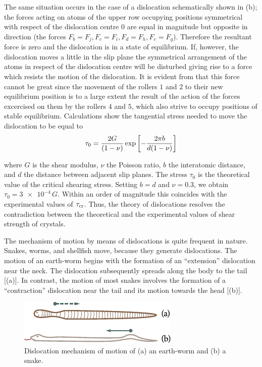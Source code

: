 The same situation occurs in the case of a dislocation schematically shown in (b); the forces acting on atoms of the upper row occupying positions symmetrical with respect of the dislocation centre $0$ are equal in magnitude but opposite in direction (the forces $F_b=F_j, F_c=F_i, F_d=F_h, F_e=F_g$). Therefore the resultant force is zero and the dislocation is in a state of equilibrium. If, however, the dislocation moves a little in the slip plane the symmetrical arrangement of the atoms in respect of the dislocation centre will be disturbed giving rise to a force which resists the motion of the dislocation. It is evident from  that this force cannot be great since the movement of the rollers $1$ and $2$ to their new equilibrium position is to a large extent the result of the action of the forces excercised on them by the rollers $4$ and $5$, which also strive to occupy positions of stable equilibrium. Calculations show the tangential stress needed to move the dislocation to be equal to
\begin{equation}\label{eq:2_17}
	\tau_0 = \frac{2G}{(1-\nu)} \exp\left[-\frac{2\pi b}{d(1-\nu)}\right]
\end{equation}

\noindent
where $G$ is the shear modulus, $\nu$ the Poisson ratio, $b$ the interatomic distance, and $d$ the distance between adjacent slip planes. The stress $\tau_0$ is the theoretical value of the critical shearing stress. Setting $b=d$ and $\nu=0.3$, we obtain $\tau_0=\num{3e-4}\,G$. Within an order of magnitude this coincides with the experimental values of $\tau_{\text{cr}}$. Thus, the theory of dislocations resolves the contradiction between the theoretical and the experimental values of shear strength of crystals.

The mechanism of motion by means of dislocations is quite frequent in nature. Snakes, worms, and shellfish move, because they generate dislocations. The motion of an earth-worm begins with the formation of an ``extension'' dislocation near the neck. The dislocation subsequently spreads along the body to the tail [(a)]. In contrast, the motion of most snakes involves the formation of a ``contraction'' dislocation near the tail and its motion towards the head [(b)].

\begin{figure}[t]
	\begin{center}
		\includegraphics[scale=1.0]{figures/ch_02/fig_2_18.pdf}
		\caption[]{Dislocation mechanism of motion of (a) an earth-worm and (b) a snake.}
		\label{fig:2_18}
	\end{center}
	\vspace{-0.7cm}
\end{figure}

